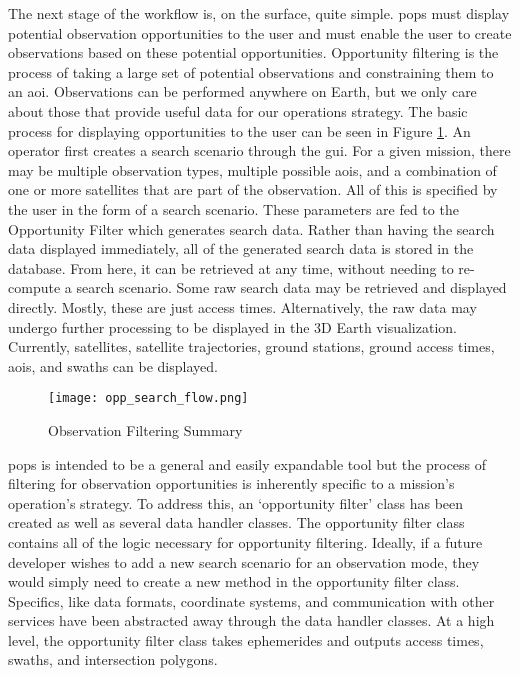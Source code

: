 The next stage of the workflow is, on the surface, quite simple. \gls{pops}
must display potential observation opportunities to the user and must enable
the user to create observations based on these potential opportunities.
Opportunity filtering is the process of taking a large set of potential
observations and constraining them to an \gls{aoi}. Observations can be
performed anywhere on Earth, but we only care about those that provide useful
data for our operations strategy.  The basic process for displaying
opportunities to the user can be seen in Figure \ref{fig:obs_fil}. An operator
first creates a search scenario through the \gls{gui}.  For a given mission,
there may be multiple observation types, multiple possible \glspl{aoi}, and a
combination of one or more satellites that are part of the observation. All of
this is specified by the user in the form of a search scenario. These
parameters are fed to the Opportunity Filter which generates search data.
Rather than having the search data displayed immediately, all of the generated
search data is stored in the database. From here, it can be retrieved at any
time, without needing to re-compute a search scenario. Some raw search data may
be retrieved and displayed directly. Mostly, these are just access times.
Alternatively, the raw data may undergo further processing to be displayed in
the 3D Earth visualization. Currently, satellites, satellite trajectories,
ground stations, ground access times, \glspl{aoi}, and swaths can be displayed.


\begin{figure} 
    \centering
    \texttt{[image: opp\_search\_flow.png]} 
    \caption{Observation Filtering Summary}
    \label{fig:obs_fil} 
\end{figure}


\gls{pops} is intended to be a general and easily expandable tool but the process of
filtering for observation opportunities is inherently specific to a mission’s
operation’s strategy. To address this, an ‘opportunity filter’ class has been
created as well as several data handler classes. The opportunity filter class
contains all of the logic necessary for opportunity filtering. Ideally, if a
future developer wishes to add a new search scenario for an observation mode,
they would simply need to create a new method in the opportunity filter class.
Specifics, like data formats, coordinate systems, and communication with other
services have been abstracted away through the data handler classes. At a high
level, the opportunity filter class takes ephemerides and outputs access times,
swaths, and intersection polygons.


